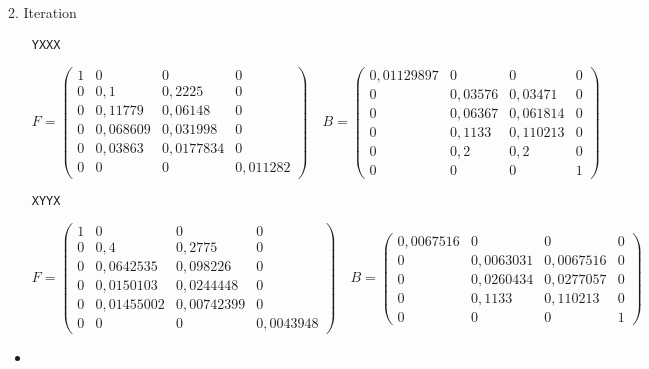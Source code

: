\documentclass{homework}
\begin{document}
\begin{enumerate}
\begin{itemize}
\end{itemize}

2. Iteration

\begin{itemize}
\item[\texttt{YXXX}]

$$F = \begin{pmatrix}
1 & 0 & 0 & 0\\
0 & 0,1 & 0,2225 & 0\\
0 & 0,11779 & 0,06148 & 0\\
0 & 0,068609 & 0,031998 & 0\\
0 & 0,03863 & 0,0177834 & 0\\
0 & 0 & 0 & 0,011282
\end{pmatrix}
\quad
B = \begin{pmatrix}
0,01129897 & 0 & 0 & 0\\
0 & 0,03576 & 0,03471 & 0\\
0 & 0,06367 & 0,061814 & 0\\
0 & 0,1133 & 0,110213 & 0\\
0 & 0,2 & 0,2 & 0\\
0 & 0 & 0 & 1
\end{pmatrix}$$

\item[\texttt{XYYX}]

$$F = \begin{pmatrix}
1 & 0 & 0 & 0\\
0 & 0,4 & 0,2775 & 0\\
0 & 0,0642535 & 0,098226 & 0\\
0 & 0,0150103 & 0,0244448 & 0\\
0 & 0,01455002 & 0,00742399 & 0\\
0 & 0 & 0 & 0,0043948
\end{pmatrix}
\quad
B = \begin{pmatrix}
0,0067516 & 0 & 0 & 0\\
0 & 0,0063031 & 0,0067516 & 0\\
0 & 0,0260434 & 0,0277057 & 0\\
0 & 0,1133 & 0,110213 & 0\\
0 & 0 & 0 & 1
\end{pmatrix}$$

\item


\end{itemize}
\end{enumerate}
\end{document}
